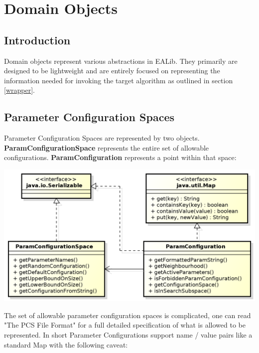 \documentclass[11pt,letterpaper,oneside]{article}
\begin{document}
\section{Domain Objects}
\label{sec:domain}
\subsection{Introduction}

Domain objects represent various abstractions in EALib. They primarily are designed to be lightweight and are entirely focused on representing the information needed for invoking the target algorithm as outlined in section \ref{wrapper}.

\subsection{Parameter Configuration Spaces}

Parameter Configuration Spaces are represented by two objects. \textbf{ParamConfigurationSpace} represents the entire set of allowable configurations. \textbf{ParamConfiguration} represents a point within that space:

\begin{center}
\includegraphics[scale=0.75]{img/UML/ConfigurationSpace.png}
\end{center}


The set of allowable parameter configuration spaces is complicated, one can read "The PCS File Format" for a full detailed specification of what is allowed to be represented. In short Parameter Configurations support name / value pairs like a standard Map with the following caveat:
\end{document}
